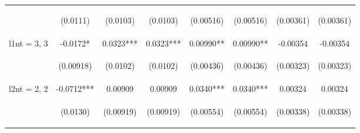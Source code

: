 \documentclass[]{article}
\begin{document}
\begin{center}
\begin{tabular}{lccccccc}
\vspace{4pt} & \begin{footnotesize}(0.0111)\end{footnotesize} & \begin{footnotesize}(0.0103)\end{footnotesize} & \begin{footnotesize}(0.0103)\end{footnotesize} & \begin{footnotesize}(0.00516)\end{footnotesize} & \begin{footnotesize}(0.00516)\end{footnotesize} & \begin{footnotesize}(0.00361)\end{footnotesize} & \begin{footnotesize}(0.00361)\end{footnotesize} \\
l1nt = 3, 3 & -0.0172* & 0.0323*** & 0.0323*** & 0.00990** & 0.00990** & -0.00354 & -0.00354 \\
\vspace{4pt} & \begin{footnotesize}(0.00918)\end{footnotesize} & \begin{footnotesize}(0.0102)\end{footnotesize} & \begin{footnotesize}(0.0102)\end{footnotesize} & \begin{footnotesize}(0.00436)\end{footnotesize} & \begin{footnotesize}(0.00436)\end{footnotesize} & \begin{footnotesize}(0.00323)\end{footnotesize} & \begin{footnotesize}(0.00323)\end{footnotesize} \\
l2nt = 2, 2 & -0.0712*** & 0.00909 & 0.00909 & 0.0340*** & 0.0340*** & 0.00324 & 0.00324 \\
\vspace{4pt} & \begin{footnotesize}(0.0130)\end{footnotesize} & \begin{footnotesize}(0.00919)\end{footnotesize} & \begin{footnotesize}(0.00919)\end{footnotesize} & \begin{footnotesize}(0.00554)\end{footnotesize} & \begin{footnotesize}(0.00554)\end{footnotesize} & \begin{footnotesize}(0.00338)\end{footnotesize} & \begin{footnotesize}(0.00338)\end{footnotesize} \\

\end{tabular}
\end{center}
\end{document}
